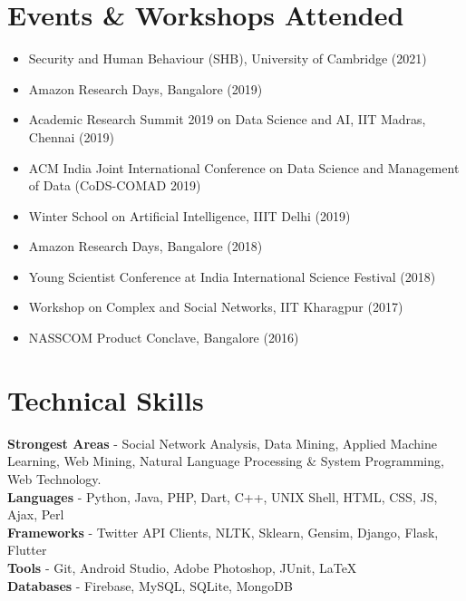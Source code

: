\documentclass[margin, centered]{res}
\begin{document}
\begin{resume}
\section{Events \& Workshops Attended}
\begin{itemize}[leftmargin=*]
\item Security and Human Behaviour (SHB), University of Cambridge (2021)
\item Amazon Research Days, Bangalore (2019)
\item Academic Research Summit 2019 on Data Science and AI, IIT Madras, Chennai (2019)
\item ACM India Joint International Conference on Data Science and Management of Data (CoDS-COMAD 2019)
\item Winter School on Artificial Intelligence, IIIT Delhi (2019)
\item Amazon Research Days, Bangalore (2018)
\item Young Scientist Conference at India International Science Festival (2018)
\item Workshop on Complex and Social Networks, IIT Kharagpur (2017)
\item NASSCOM Product Conclave, Bangalore (2016)
\end{itemize}


\section{Technical \hspace{2mm} Skills}
\textbf{Strongest Areas} - Social Network Analysis, Data Mining, Applied Machine Learning, Web Mining, Natural Language Processing \& System Programming, Web Technology.  \\
\textbf{Languages} - Python, Java, PHP, Dart, C++, UNIX Shell, HTML, CSS, JS, Ajax, Perl \\
\textbf{Frameworks} - Twitter API Clients, NLTK, Sklearn, Gensim, Django, Flask, Flutter \\
\textbf{Tools} - Git, Android Studio, Adobe Photoshop, JUnit, \LaTeX \\
\textbf{Databases} - Firebase, MySQL, SQLite, MongoDB \\



\end{resume}
\end{document}
